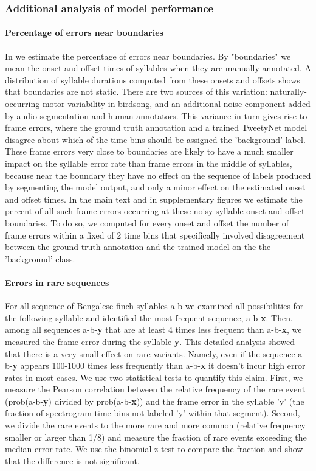 \documentclass[9pt,lineno]{elife}
\begin{document}
\subsubsection{Additional analysis of model performance}

\paragraph{Percentage of errors near boundaries}
In  we estimate 
the percentage of errors near boundaries. 
By "boundaries" we mean the onset and offset times of syllables 
when they are manually annotated. 
A distribution of syllable durations computed from these onsets and offsets 
shows that boundaries are not static. 
There are two sources of this variation: 
naturally-occurring motor variability in birdsong, 
and an additional noise component added by audio segmentation and human annotators. 
This variance in turn gives rise to frame errors, 
where the ground truth annotation and a trained TweetyNet model disagree 
about which of the time bins should be assigned the 'background' label. 
These frame errors very close to boundaries are likely to have a much smaller 
impact on the syllable error rate than frame errors in the middle of syllables,  
because near the boundary they have no effect on the 
sequence of labels produced by segmenting the model output, 
and only a minor effect on the estimated onset and offset times. 
In the main text and in supplementary figures we
estimate the percent of all such frame errors occurring 
at these noisy syllable onset and offset boundaries. 
To do so, we computed for every onset and offset the number of frame errors 
within a fixed of 2 time bins that specifically involved disagreement 
between the ground truth annotation and the trained model on the the 'background' class.

\paragraph{Errors in rare sequences}
For all sequence of Bengalese finch syllables a-b we examined all possibilities for the following syllable and identified the most frequent sequence, a-b-{\bf x}. Then, among all sequences a-b-{\bf y} that are at least 4 times less frequent than a-b-{\bf x}, we measured the frame error during the syllable {\bf y}. This detailed analysis showed that there is a very small effect on rare variants. Namely, even if the sequence a-b-{\bf y} appears 100-1000 times less frequently than a-b-{\bf x} it doesn't incur high error rates in most cases. We use two statistical tests to quantify this claim. First, we measure the Pearson correlation between the relative frequency of the rare event (prob(a-b-{\bf y}) divided by prob(a-b-{\bf x})) and the frame error in the syllable 'y' (the fraction of spectrogram time bins not labeled 'y' within that segment). Second, we divide the rare events to the more rare and more common (relative frequency smaller or larger than 1/8) and measure the fraction of rare events exceeding the median error rate. We use the binomial z-test to compare the fraction and show that the difference is not significant.
\end{document}
